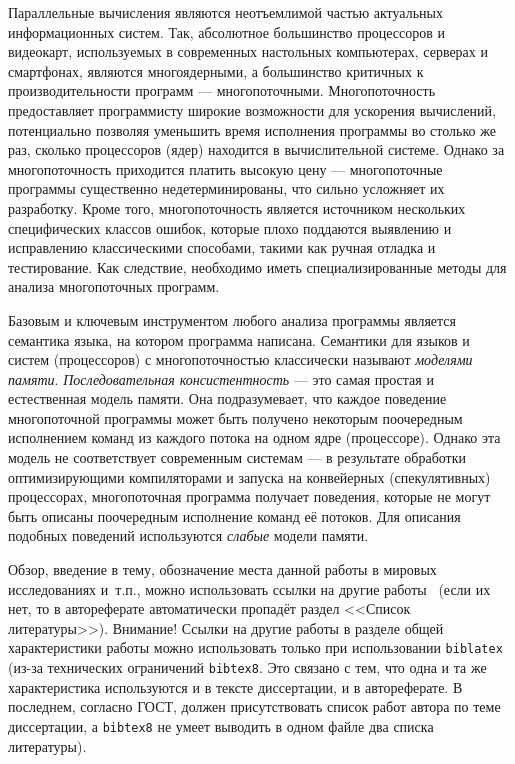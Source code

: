 
{\actuality} Параллельные вычисления являются неотъемлимой частью актуальных
информационных систем. Так, абсолютное большинство процессоров и видеокарт, используемых
в современных настольных компьютерах, серверах и смартфонах, являются многоядерными,
а большинство критичных к производительности программ --- многопоточными.
Многопоточность предоставляет программисту широкие возможности для ускорения вычислений,
потенциально позволяя уменьшить время исполнения программы во столько же раз, сколько
процессоров (ядер) находится в вычислительной системе. Однако за многопоточность приходится
платить высокую цену --- многопоточные программы существенно недетерминированы, что сильно
усложняет их разработку. Кроме того, многопоточность является источником нескольких
специфических классов ошибок, которые плохо поддаются выявлению и исправлению классическими
способами, такими как ручная отладка и тестирование. Как следствие, необходимо иметь
специализированные методы для анализа многопоточных программ.

Базовым и ключевым инструментом любого анализа программы является семантика языка,
на котором программа написана. Семантики для языков и систем (процессоров) с
многопоточностью классически называют \emph{моделями памяти}.
\emph{Последовательная консистентность} --- это самая простая и естественная модель
памяти. Она подразумевает, что каждое поведение многопоточной программы может быть
получено некоторым поочередным исполнением команд из каждого потока на одном ядре
(процессоре). Однако эта модель не соответствует современным системам ---
в результате обработки оптимизирующими компиляторами и запуска на конвейерных
(спекулятивных) процессорах, многопоточная программа получает поведения, которые не могут
быть описаны поочередным исполнение команд её потоков. Для описания подобных поведений
используются \emph{слабые} модели памяти.

Обзор, введение в тему, обозначение места данной работы в
мировых исследованиях и~т.\:п., можно использовать ссылки на другие
работы~\cite{Gosele1999161} (если их нет, то в автореферате
автоматически пропадёт раздел <<Список литературы>>). Внимание! Ссылки
на другие работы в разделе общей характеристики работы можно
использовать только при использовании \verb!biblatex! (из-за технических
ограничений \verb!bibtex8!. Это связано с тем, что одна и та же
характеристика используются и в тексте диссертации, и в
автореферате. В последнем, согласно ГОСТ, должен присутствовать список
работ автора по теме диссертации, а \verb!bibtex8! не умеет выводить в одном
файле два списка литературы).

